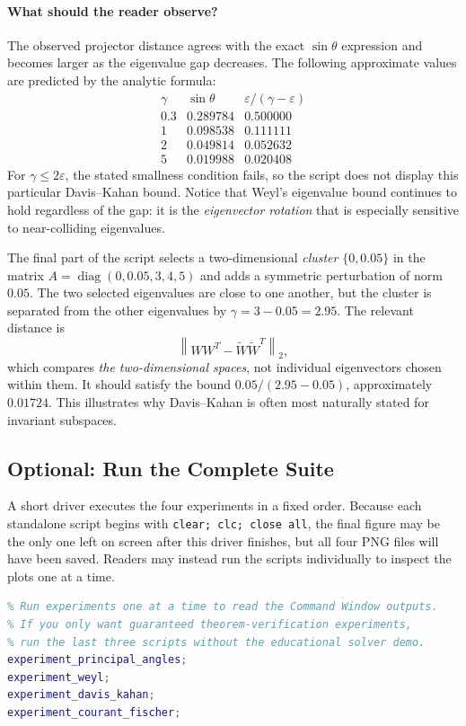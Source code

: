 \documentclass[14pt,letterpaper]{article}
\theoremstyle{plain}
\theoremstyle{definition}
\theoremstyle{remark}
\newcommand{\norm}[1]{\left\lVert #1 \right\rVert}
\DeclareMathOperator{\diag}{diag}
\begin{document}
\paragraph{What should the reader observe?}
The observed projector distance agrees with the exact
$\sin\theta$ expression and becomes larger as the
eigenvalue gap decreases. The following approximate
values are predicted by the analytic formula:
\[
\begin{array}{c|c|c}
\gamma&\sin\theta&\varepsilon/(\gamma-\varepsilon)\\\hline
0.3&0.289784&0.500000\\
1&0.098538&0.111111\\
2&0.049814&0.052632\\
5&0.019988&0.020408
\end{array}
\]
For $\gamma\leq2\varepsilon$, the stated smallness
condition fails, so the script does not display this
particular Davis--Kahan bound. Notice that Weyl's
eigenvalue bound continues to hold regardless of the
gap: it is the \emph{eigenvector rotation} that is
especially sensitive to near-colliding eigenvalues.

The final part of the script selects a two-dimensional
\emph{cluster} $\{0,0.05\}$ in the matrix
$A=\diag(0,0.05,3,4,5)$ and adds a symmetric
perturbation of norm $0.05$. The two selected
eigenvalues are close to one another, but the cluster
is separated from the other eigenvalues by
$\gamma=3-0.05=2.95$. The relevant distance is
\[
\norm{WW^T-\widetilde W\widetilde W^T}_2,
\]
which compares \emph{the two-dimensional spaces}, not
individual eigenvectors chosen within them. It should
satisfy the bound $0.05/(2.95-0.05)$, approximately
$0.01724$. This illustrates why Davis--Kahan is often
most naturally stated for invariant subspaces.

\subsection{Optional: Run the Complete Suite}
\label{subsec:matlab_all}

A short driver executes the four experiments in a
fixed order. Because each standalone script begins
with \texttt{clear; clc; close all}, the final figure
may be the only one left on screen after this driver
finishes, but all four PNG files will have been saved.
Readers may instead run the scripts individually
to inspect the plots one at a time.

\begin{lstlisting}[language=Matlab,caption={Driver for running all four MATLAB experiments.},label={lst:experiment_all}]
% run_all_experiments.m
% Run experiments one at a time to read the Command Window outputs.
% If you only want guaranteed theorem-verification experiments,
% run the last three scripts without the educational solver demo.
experiment_principal_angles;
experiment_weyl;
experiment_davis_kahan;
experiment_courant_fischer;
\end{lstlisting}
\end{document}
